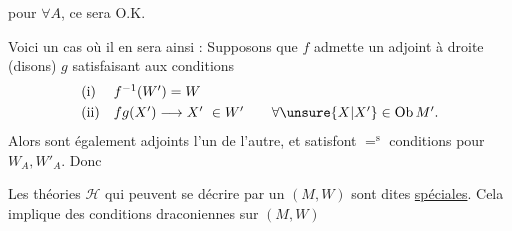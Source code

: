 pour $\forall A$, ce sera O.K.

Voici un cas où il en sera ainsi : Supposons que $f$ admette
un adjoint à droite (disons) $g$ satisfaisant aux conditions
\[
\begin{array}{ll}
\text{(i)} & f^{-1}(W')=W \\[3pt]
\text{(ii)} & fg(X')\longrightarrow X'\ \in W'
\qquad \forall\unsure{X|X'}\in\operatorname{Ob}M'.
\end{array}
\]
Alors
sont également adjoints l'un de l'autre, et 
satisfont $=^{\mathrm{s}}$ conditions pour $W_A,W'_A$. Donc

Les théories $\mathcal H$ qui peuvent se décrire par un $(M,W)$ sont dites
\uline{spéciales}. Cela implique des conditions draconiennes sur $(M,W)$
